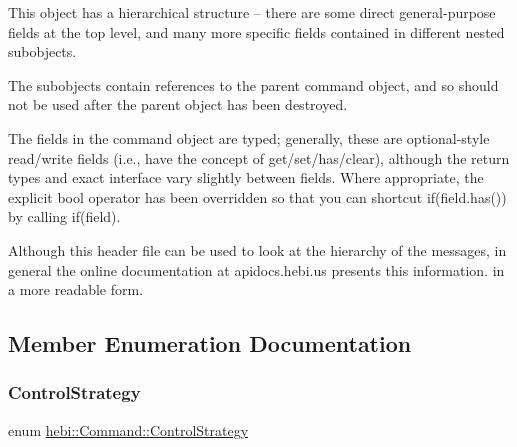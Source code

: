 This object has a hierarchical structure -- there are some direct general-\/purpose fields at the top level, and many more specific fields contained in different nested subobjects.

The subobjects contain references to the parent command object, and so should not be used after the parent object has been destroyed.

The fields in the command object are typed; generally, these are optional-\/style read/write fields (i.\+e., have the concept of get/set/has/clear), although the return types and exact interface vary slightly between fields. Where appropriate, the explicit bool operator has been overridden so that you can shortcut {\ttfamily if}(field.\+has()) by calling {\ttfamily if(field)}.

Although this header file can be used to look at the hierarchy of the messages, in general the online documentation at apidocs.\+hebi.\+us presents this information. in a more readable form. 

\subsection{Member Enumeration Documentation}
\mbox{\label{classhebi_1_1Command_a0f4b41003c36dee21578caddb605c64a}} 
\subsubsection{\texorpdfstring{Control\+Strategy}{ControlStrategy}}
{\footnotesize\ttfamily enum \hyperlink{classhebi_1_1Command_a0f4b41003c36dee21578caddb605c64a}{hebi\+::\+Command\+::\+Control\+Strategy}}

